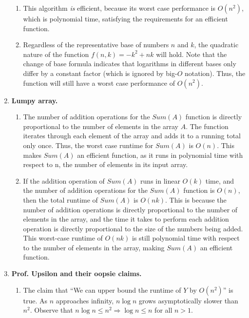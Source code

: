 \documentclass{article}
\begin{document}
\begin{enumerate}
\begin{enumerate}
    
    
        \item This algorithm \textit{is} efficient, because its worst case performance is $O(n^2)$, which is polynomial time, satisfying the requirements for an efficient function.
    
    
    
        \item Regardless of the representative base of numbers $n$ and $k$, the quadratic nature of the function $f(n, k) = -k^2+nk$ will hold. Note that the change of base formula indicates that logarithms in different bases only differ by a constant factor (which is ignored by big-$O$ notation). Thus, the function will still have a worst case performance of $O(n^2)$.
    \end{enumerate}



    \item \textbf{Lumpy array.}
    \begin{enumerate}
        \item The number of addition operations for the $Sum(A)$ function is directly proportional to the number of elements in the array $A$. The function iterates through each element of the array and adds it to a running total only once. Thus, the worst case runtime for $Sum(A)$ is $O(n)$. This makes $Sum(A)$ an efficient function, as it runs in polynomial time with respect to n, the number of elements in its input array.
    
    
    
        \item If the addition operation of $Sum(A)$ runs in linear $O(k)$ time, and the number of addition operations for the $Sum(A)$ function is $O(n)$, then the total runtime of $Sum(A)$ is $O(nk)$. This is because the number of addition operations is directly proportional to the number of elements in the array, and the time it takes to perform each addition operation is directly proportional to the size of the numbers being added. This worst-case runtime of $O(nk)$ is still polynomial time with respect to the number of elements in the array, making $Sum(A)$ an efficient function.
    \end{enumerate}



    \item \textbf{Prof. Upsilon and their oopsie claims.}
    \begin{enumerate}
        \item The claim that ``We can upper bound the runtime of $Y$ by $O(n^2)$'' is true. As $n$ approaches infinity, $n \log n$ grows asymptotically slower than $n^2$. Observe that $n \log n \leq n^2 \Rightarrow \log n \leq n$ for all $n > 1$. 
        



\end{enumerate}
\end{enumerate}
\end{document}
